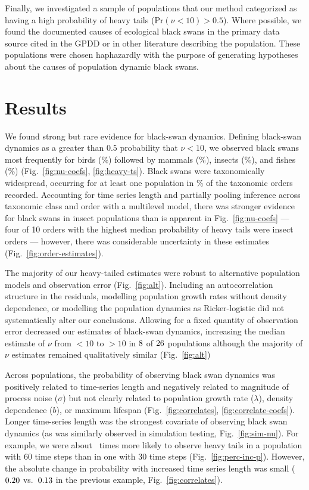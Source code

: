 Finally, we investigated a sample of populations that our method categorized as
having a high probability of heavy tails (Pr$(\nu < 10) > 0.5$). Where
possible, we found the documented causes of ecological black swans in the
primary data source cited in the GPDD or in other literature describing the
population. These populations were chosen haphazardly with the purpose of
generating hypotheses about the causes of population dynamic black swans.

\section{Results}

We found strong but rare evidence for black-swan dynamics. Defining black-swan
dynamics as a greater than $0.5$ probability that $\nu < 10$, we observed black
swans most frequently for birds (\birdPH\%) followed by mammals (\mammalsPH\%),
insects (\insectsPH\%), and fishes (\fishPH\%) (Fig.~\ref{fig:nu-coefs},
\ref{fig:heavy-ts}). Black swans were taxonomically widespread, occurring for
at least one population in \POrdersHeavy\% of the taxonomic orders recorded.
Accounting for time series length and partially pooling inference across
taxonomic class and order with a multilevel model, there was stronger evidence
for black swans in insect populations than is apparent in
Fig.~\ref{fig:nu-coefs} --- four of 10 orders with the highest median
probability of heavy tails were insect orders --- however, there was
considerable uncertainty in these estimates (Fig.~\ref{fig:order-estimates}).

The majority of our heavy-tailed estimates were robust to alternative
population models and observation error (Fig.~\ref{fig:alt}). Including an
autocorrelation structure in the residuals, modelling population growth rates
without density dependence, or modelling the population dynamics as
Ricker-logistic did not systematically alter our conclusions. Allowing for
a fixed quantity of observation error decreased our estimates of black-swan
dynamics, increasing the median estimate of $\nu$ from $<10$ to $>10$ in
$8$ of $26$ populations although the majority of
$\nu$ estimates remained qualitatively similar (Fig.~\ref{fig:alt})

Across populations, the probability of observing black swan dynamics was
positively related to time-series length and negatively related to magnitude of
process noise ($\sigma$) but not clearly related to population growth rate
($\lambda$), density dependence ($b$), or maximum lifespan
(Fig.~\ref{fig:correlates}, \ref{fig:correlate-coefs}). Longer time-series
length was the strongest covariate of observing black swan dynamics (as was
similarly observed in simulation testing, Fig.~\ref{fig:sim-nu}). For example,
we were about \pIncHeavyNThirtyNSixty~times more likely to observe heavy tails
in a population with 60 time steps than in one with 30 time steps
(Fig.~\ref{fig:perc-inc-p}). However, the absolute change in probability with
increased time series length was small ($0.20$ vs.\
$0.13$ in the previous example, Fig.~\ref{fig:correlates}).

